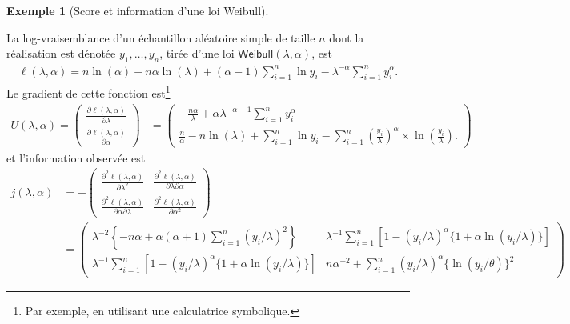 \documentclass[
  11pt,
  letterpaper,
]{scrbook}
\theoremstyle{plain}
\theoremstyle{definition}
\newtheorem{example}{Exemple}[chapter]
\theoremstyle{plain}
\theoremstyle{definition}
\theoremstyle{remark}
\begin{document}
\begin{example}[Score et information d'une loi
Weibull]\protect\hypertarget{exm-weibull-emv}{}\label{exm-weibull-emv}

La log-vraisemblance d'un échantillon aléatoire simple de taille \(n\)
dont la réalisation est dénotée \(y_1, \ldots, y_n\), tirée d'une loi
\(\mathsf{Weibull}(\lambda, \alpha)\), est \begin{align*}
\ell(\lambda, \alpha) = n \ln(\alpha) - n\alpha\ln(\lambda) + (\alpha-1) \sum_{i=1}^n \ln y_i  - \lambda^{-\alpha}\sum_{i=1}^n y_i^\alpha.
\end{align*} Le gradient de cette fonction est\footnote{Par exemple, en
  utilisant une calculatrice symbolique.} \begin{align*}
U(\lambda, \alpha) = \begin{pmatrix}\frac{\partial \ell(\lambda, \alpha)}{\partial \lambda} \\
\frac{\partial \ell(\lambda, \alpha)}{\partial \alpha} \end{pmatrix} &= 
\begin{pmatrix}
 -\frac{n\alpha}{\lambda} +\alpha\lambda^{-\alpha-1}\sum_{i=1}^n y_i^\alpha
 \\
 \frac{n}{\alpha} - n \ln(\lambda) + \sum_{i=1}^n \ln y_i  - \sum_{i=1}^n \left(\frac{y_i}{\lambda}\right)^{\alpha} \times\ln\left(\frac{y_i}{\lambda}\right).
 \end{pmatrix}
\end{align*} et l'information observée est \begin{align*}
j(\lambda, \alpha) &= - \begin{pmatrix}
\frac{\partial^2 \ell(\lambda, \alpha)}{\partial \lambda^2} &  \frac{\partial^2 \ell(\lambda, \alpha)}{\partial \lambda \partial \alpha} \\ \frac{\partial^2 \ell(\lambda, \alpha)}{\partial \alpha \partial \lambda} & \frac{\partial^2 \ell(\lambda, \alpha)}{\partial \alpha^2}
\end{pmatrix} 
\\&= \begin{pmatrix}
\lambda^{-2}\left\{-n\alpha + \alpha(\alpha+1)\sum_{i=1}^n (y_i/\lambda)^2\right\} & \lambda^{-1}\sum_{i=1}^n [1-(y_i/\lambda)^\alpha\{1+\alpha\ln(y_i/\lambda)\}]\\ \lambda^{-1}\sum_{i=1}^n [1-(y_i/\lambda)^\alpha\{1+\alpha\ln(y_i/\lambda)\}]& n\alpha^{-2} + \sum_{i=1}^n (y_i/\lambda)^\alpha \{\ln(y_i/\theta)\}^2
\end{pmatrix}
\end{align*}

\end{example}
\end{document}
